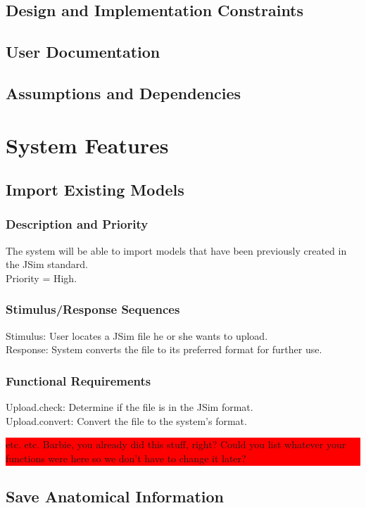 \documentclass{article}
\newcommand{\todo}[1]{\colorbox{red}{\begin{minipage}{\textwidth}{#1}\end{minipage}}}
\begin{document}
\subsection{Design and Implementation Constraints}
\subsection{User Documentation}
\subsection{Assumptions and Dependencies}

\section{System Features}

\subsection{Import Existing Models}

\subsubsection{Description and Priority}
The system will be able to import models that have been previously created in the JSim standard.\\
Priority = High.

\subsubsection{Stimulus/Response Sequences}
Stimulus: User locates a JSim file he or she wants to upload.\\
Response: System converts the file to its preferred format for further use.

\subsubsection{Functional Requirements}
Upload.check: Determine if the file is in the JSim format.\\
Upload.convert: Convert the file to the system's format.

\todo{etc. etc. Barbie, you already did this stuff, right?  Could you list whatever your functions were here so we don't have to change it later?}

\subsection{Save Anatomical Information}
\end{document}
